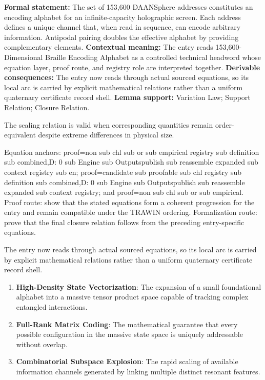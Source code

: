 \begingroup\footnotesize\setlength{\emergencystretch}{3em}\sloppy
\textbf{Formal statement:} The set of 153,600 DAANSphere addresses constitutes an encoding alphabet for an infinite-capacity holographic screen. Each address defines a unique channel that, when read in sequence, can encode arbitrary information. Antipodal pairing doubles the effective alphabet by providing complementary elements. \textbf{Contextual meaning:} The entry reads 153,600-Dimensional Braille Encoding Alphabet as a controlled technical headword whose equation layer, proof route, and registry role are interpreted together. \textbf{Derivable consequences:} The entry now reads through actual sourced equations, so its local arc is carried by explicit mathematical relations rather than a uniform quaternary certificate record shell. \textbf{Lemma support:} Variation Law; Support Relation; Closure Relation.\par
\endgroup

The scaling relation is valid when corresponding quantities remain order-equivalent despite extreme differences in physical size.

Equation anchors: proof=non sub chl sub or sub empirical registry sub definition sub combined,D: 0 sub Engine sub Outputspublish sub reassemble expanded sub context registry sub en; proof=candidate sub proofable sub chl registry sub definition sub combined,D: 0 sub Engine sub Outputspublish sub reassemble expanded sub context registry; and proof=non sub chl sub or sub empirical. Proof route: show that the stated equations form a coherent progression for the entry and remain compatible under the TRAWIN ordering. Formalization route: prove that the final closure relation follows from the preceding entry-specific equations.

The entry now reads through actual sourced equations, so its local arc is carried by explicit mathematical relations rather than a uniform quaternary certificate record shell.
\endgroup

\begin{enumerate}[leftmargin=1.6em,itemsep=6pt,topsep=4pt]
\item \textbf{High-Density State Vectorization}: The expansion of a small foundational alphabet into a massive tensor product space capable of tracking complex entangled interactions.
\item \textbf{Full-Rank Matrix Coding}: The mathematical guarantee that every possible configuration in the massive state space is uniquely addressable without overlap.
\item \textbf{Combinatorial Subspace Explosion}: The rapid scaling of available information channels generated by linking multiple distinct resonant features.
\end{enumerate}

